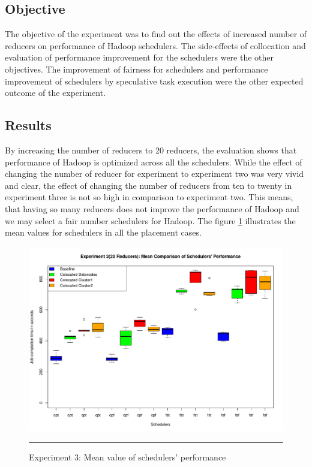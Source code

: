 \subsection{Objective}
The objective of the experiment was to find out the effects of increased number of reducers on performance of Hadoop schedulers. The side-effects of collocation and evaluation of performance improvement for the schedulers were the other objectives. The improvement of fairness for schedulers and  performance improvement of schedulers by speculative task execution were the other expected outcome of the experiment. 

\subsection{Results }
By increasing the number of reducers to 20 reducers, the evaluation shows that performance of Hadoop is optimized across all the schedulers. While the effect of changing the number of reducer for experiment to experiment two was very vivid and clear, the effect of changing the number of reducers from ten to twenty in experiment three is not so high in comparison to experiment two. This means, that having so many reducers does not improve the performance of Hadoop and we may select a fair number schedulers for Hadoop. The figure \ref{fig:exp_3_mean} illustrates the mean values for schedulers in all the placement cases.  


\begin{figure}[htbp]
  \centering
    \includegraphics[width=\textwidth,height=\textheight,keepaspectratio]{./Figures/exp_3_mean.pdf}
    \rule{35em}{0.5pt}
  \caption{Experiment 3: Mean value of schedulers' performance}
  \label{fig:exp_3_mean}
\end{figure}


